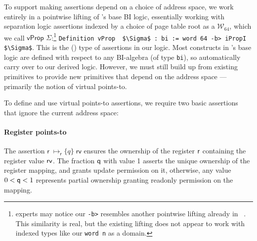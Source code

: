 To support making assertions depend on a choice of address space, we work entirely in a pointwise lifting of \iris's base BI logic,
essentially working with separation logic assertions indexed by a choice of page table root as a $\mathcal{W}_{64}$, which we call $\textsf{vProp }\Sigma$:\footnote{
  \iris experts may notice our \lstinline|-b>| resembles another pointwise lifting already in  \iris~\cite{dang2019rustbelt,dang2022compass}. 
  This similarity is real, but the existing lifting does not appear to work with indexed \coq types
  like our \lstinline|word n| as a domain.
}
\lstinline[language=Coq]|Definition vProp  $\Sigma$ : bi := word 64 -b> iPropI  $\Sigma$|.
This is the (\rocq) type of assertions in our logic.
Most constructs in \iris's base logic are defined with respect to any BI-algebra (of \coq type \lstinline|bi|), so automatically
carry over to our derived logic.
However, we must still build up from existing \iris primitives to provide new primitives that depend on the address space --- primarily the notion
of virtual points-to.


To define and use virtual points-to assertions, we require two basic assertions that ignore
the current address space:

\paragraph{Register points-to} 
The assertion $\textsf{r}\;\mapsto_{\textsf{r}}\{q\}\;\textsf{rv}$ ensures the ownership of the register $\mathsf{r}$ containing the register value $\mathsf{rv}$. 
The fraction $\mathsf{q}$ with value 1 asserts the unique ownership of the register mapping, and grants update permission on it, 
otherwise, any value $0 < \mathsf{q} <1$ represents partial ownership granting readonly permission on the mapping.


